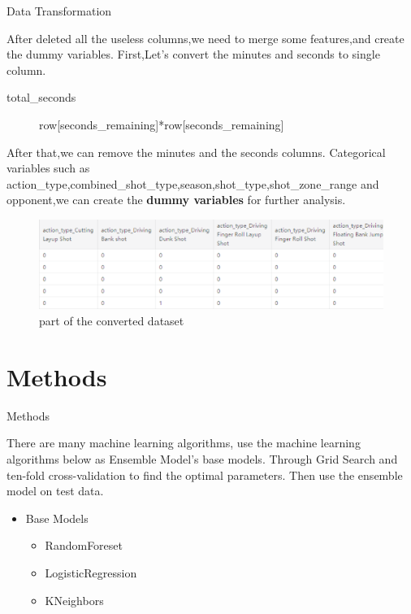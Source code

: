 \documentclass[
size=14pt,
paper=smartboard,  %
mode=present, 		%
display=slides, 	%
pauseslide,
fleqn,leqno]{powerdot}
\begin{document}
\begin{slide}{Data Transformation}

After deleted all the useless columns,we need to merge some features,and create the dummy variables.
First,Let's convert the minutes and seconds to single column.
\begin{description}
	\item[total\_seconds] row[seconds\_remaining]*row[seconds\_remaining] 
\end{description}
After that,we can remove the minutes and the seconds columns.
Categorical variables such as action_type,combined_shot_type,season,shot_type,shot_zone_range 
and opponent,we can create the \textbf{dummy variables} for further analysis.
\begin{figure}[htbp]
	\centering
	\includegraphics[scale=0.6]{u.eps
	}        %
	\caption{part of the converted dataset}
\end{figure}
\end{slide}


\section{Methods}


\begin{slide}[toc=,bm=]{Methods}

There are many machine learning algorithms, 
use the machine learning algorithms below
as Ensemble Model’s base models. 
Through Grid Search and
ten-fold cross-validation
to find the optimal parameters.
Then use the ensemble model on
test data.

\begin{center}
	\begin{itemize}
		\item Base Models
		\
		\begin{itemize}
			\item RandomForeset
			\item LogisticRegression	
			\item KNeighbors
		\end{itemize}
	\end{itemize}
\end{center}

\end{slide}
\end{document}
